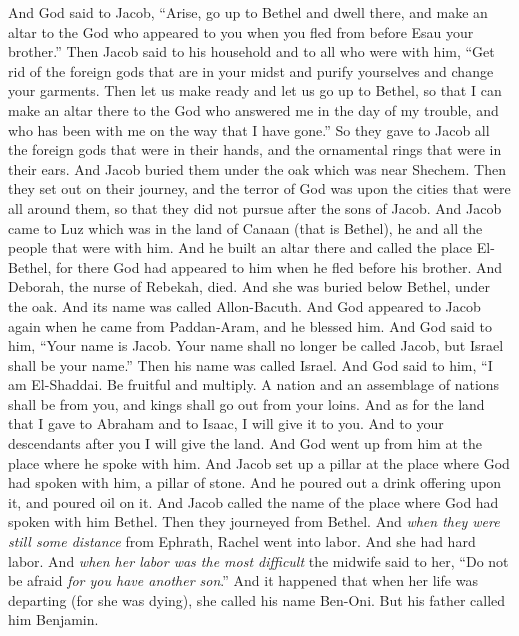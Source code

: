 \begin{biblechapter} %
 And God said to Jacob, “Arise, go up to Bethel and dwell there, and make an altar to the God who appeared to you when you fled from before Esau your brother.”
\verse Then Jacob said to his household and to all who were with him, “Get rid of the foreign gods that are in your midst and purify yourselves and change your garments.
\verse Then let us make ready and let us go up to Bethel, so that I can make an altar there to the God who answered me in the day of my trouble, and who has been with me on the way that I have gone.”
\verse So they gave to Jacob all the foreign gods that were in their hands, and the ornamental rings that were in their ears. And Jacob buried them under the oak which was near Shechem.
\verse Then they set out on their journey, and the terror of God was upon the cities that were all around them, so that they did not pursue after the sons of Jacob.
\verse And Jacob came to Luz which was in the land of Canaan (that is Bethel), he and all the people that were with him.
\verse And he built an altar there and called the place El-Bethel, for there God had appeared to him when he fled before his brother.
\verse And Deborah, the nurse of Rebekah, died. And she was buried below Bethel, under the oak. And its name was called Allon-Bacuth.
\verse And God appeared to Jacob again when he came from Paddan-Aram, and he blessed him.
\verse And God said to him, “Your name is Jacob. Your name shall no longer be called Jacob, but Israel shall be your name.” Then his name was called Israel.
\verse And God said to him, “I am El-Shaddai. Be fruitful and multiply. A nation and an assemblage of nations shall be from you, and kings shall go out from your loins.
\verse And as for the land that I gave to Abraham and to Isaac, I will give it to you. And to your descendants after you I will give the land.
\verse And God went up from him at the place where he spoke with him.
\verse And Jacob set up a pillar at the place where God had spoken with him, a pillar of stone. And he poured out a drink offering upon it, and poured oil on it.
\verse And Jacob called the name of the place where God had spoken with him Bethel.
 Then they journeyed from Bethel. And \textit{when they were still some distance} from Ephrath, Rachel went into labor. And she had hard labor.
\verse And \textit{when her labor was the most difficult} the midwife said to her, “Do not be afraid \textit{for you have another son}.”
\verse And it happened that when her life was departing (for she was dying), she called his name Ben-Oni. But his father called him Benjamin.

\end{biblechapter}
